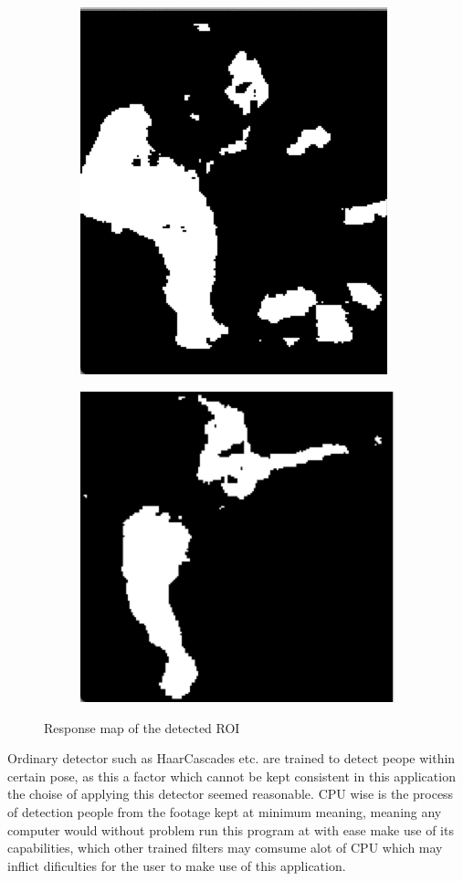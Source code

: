 \begin{figure}[H]
        \centering
        \begin{subfigure}[b]{0.3\textwidth}
        	\centering
				\includegraphics[scale=0.5]{Images/roi_response1.png}
        \end{subfigure}%
        \begin{subfigure}[b]{0.3\textwidth}
        	\centering
				\includegraphics[scale=0.5]{Images/roi_response2.png}
        \end{subfigure}
        \label{fig:responsemap}
        \caption{Response map of the  detected ROI}
\end{figure}
Ordinary detector such as HaarCascades etc. are trained to detect peope within certain pose, as this a factor which cannot be kept consistent in this application the choise  of applying this detector seemed reasonable. CPU wise is the process of detection people from the footage kept at minimum meaning, meaning any computer would without problem run this program at with ease make use of its capabilities, which other trained filters may comsume alot of CPU which may inflict dificulties for the user to make use of this application. 


